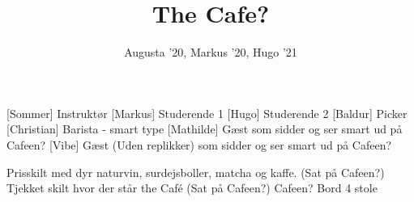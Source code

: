 \documentclass[a4paper,11pt]{article}
\title{The Cafe?}
\author{Augusta '20, Markus '20, Hugo '21}
\begin{document}
\maketitle

\begin{roles}
[Sommer] Instruktør
[Markus] Studerende 1 
[Hugo] Studerende 2 
[Baldur] Picker
[Christian] Barista - smart type 
[Mathilde] Gæst som sidder og ser smart ud på Cafeen?
[Vibe] Gæst (Uden replikker) som sidder og ser smart ud på Cafeen?

\end{roles}

\begin{props}
 Prisskilt med dyr naturvin, surdejsboller, matcha og kaffe. (Sat på Cafeen?)
 Tjekket skilt hvor der står the Café (Sat på Cafeen?)
 Cafeen?
 Bord
 4 stole
\end{props}
\end{document}
